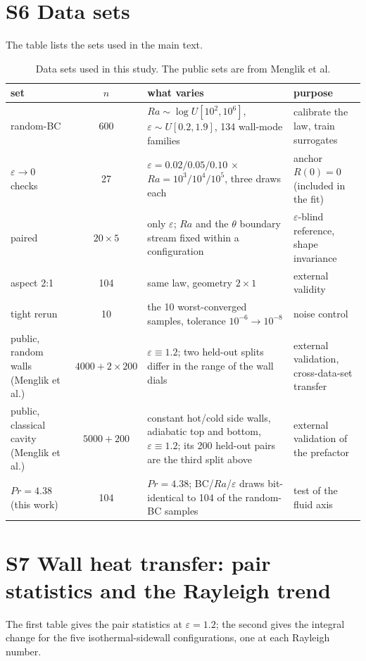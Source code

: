 \documentclass[preprint,11pt,a4paper,times]{elsarticle}
\begin{document}
\section*{S6 Data sets}
The table lists the sets used in the main text.
\begin{table}[htbp]
\centering
\footnotesize
\setlength{\tabcolsep}{4pt}
\caption{Data sets used in this study. The public sets are from
Menglik et al.}
\label{tab:data}
\begin{tabular}{@{}p{3.0cm}c p{4.0cm}p{2.8cm}@{}}
\toprule
set & $n$ & what varies & purpose\\
\midrule
random-BC & 600 & $Ra\sim\log U[10^2,10^6]$, $\varepsilon\sim U[0.2,1.9]$, 134 wall-mode
families & calibrate the law, train surrogates\\
$\varepsilon\to0$ checks & 27 & $\varepsilon=0.02/0.05/0.10$ $\times$ $Ra=10^3/10^4/10^5$, three draws each &
anchor $R(0)=0$ (included in the fit)\\
paired & $20\times5$ & only $\varepsilon$; $Ra$ and the $\theta$ boundary stream fixed within a
configuration & $\varepsilon$-blind reference, shape invariance\\
aspect 2:1 & 104 & same law, geometry $2\times1$ & external validity\\
tight rerun & 10 & the 10 worst-converged samples, tolerance $10^{-6}\to10^{-8}$ & noise control\\
public, random walls (Menglik et al.) & $4000+2\times200$ & $\varepsilon\equiv1.2$; two
held-out splits differ in the range of the wall dials & external
validation, cross-data-set transfer\\
public, classical cavity (Menglik et al.) & $5000+200$ & constant hot/cold side walls,
adiabatic top and bottom, $\varepsilon\equiv1.2$; its 200 held-out pairs are the third split above
& external validation of the prefactor\\
$Pr=4.38$ (this work) & 104 & $Pr=4.38$; BC/$Ra$/$\varepsilon$ draws bit-identical to 104 of the
random-BC samples & test of the fluid axis\\
\bottomrule
\end{tabular}
\end{table}

\section*{S7 Wall heat transfer: pair statistics and the Rayleigh trend}
The first table gives the pair statistics at $\varepsilon=1.2$; the second gives the integral
change for the five isothermal-sidewall configurations, one at each Rayleigh number.
\end{document}
